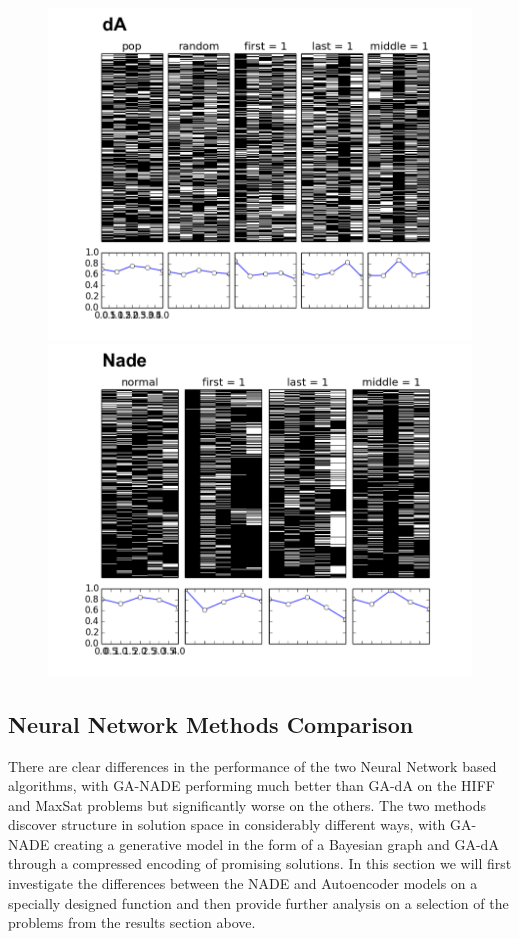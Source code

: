 \documentclass[twoside]{article}
\begin{document}
\begin{figure}[t!]
\centering
    \includegraphics[scale=0.7]{da_croad.pdf}
  \includegraphics[scale=0.7]{nade_croad.pdf}
  \caption{}
  \label{fig:nade_vs_da2}
\end{figure}

\subsection{Neural Network Methods Comparison}

There are clear differences in the performance of the two Neural Network based algorithms, with GA-NADE performing much better than GA-dA on the HIFF and MaxSat problems but significantly worse on the others. The two methods discover structure in solution space in considerably different ways, with GA-NADE creating a generative model in the form of a Bayesian graph and GA-dA through a compressed encoding of promising solutions. In this section we will first investigate the differences between the NADE and Autoencoder models on a specially designed function and then provide further analysis on a selection of the problems from the results section above.
\end{document}
